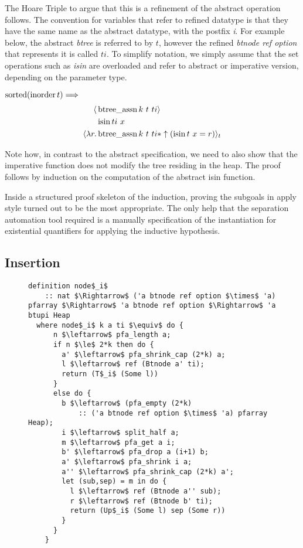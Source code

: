 The Hoare Triple to argue that this is a refinement of the abstract operation
follows.
The convention for variables that refer to refined datatype
is that they have the same name as the abstract datatype,
with the postfix \textit{i}.
For example below, the abstract \textit{btree} is referred to by $t$,
however the refined \textit{btnode ref option} that represents it
is called $ti$.
To simplify notation, we simply assume that the set operations
such as \textit{isin} are overloaded and refer to abstract or
imperative version, depending on the parameter type.

\begin{lemma} $\operatorname{sorted} (\operatorname{inorder} t) \Longrightarrow$ \\
\begin{align*}
   \langle &\operatorname{btree\_assn} k\ t\ ti\rangle \\
           &\operatorname{isin} ti\ x \\
   \langle \lambda r. &\operatorname{btree\_assn} k\ t\ ti * \uparrow(\operatorname{isin} t\ x = r)\rangle_t
\end{align*}
\end{lemma}

Note how, in contrast to the abstract specification,
we need to also show that the imperative function does not modify the tree
residing in the heap.
The proof follows by induction on the computation of the abstract isin function.

Inside a structured proof skeleton of the induction,
proving the subgoals in apply style turned out to be the most
appropriate.
The only help that the separation automation tool required
is a manually specification of the instantiation for existential quantifiers
for applying the inductive hypothesis. 

\subsection{Insertion}
\begin{figure}
\begin{lstlisting}[mathescape=true, language=Isabelle, label={lst:imp-nodei-fun},
    caption={The imperative node$_i$ function}]
definition node$_i$ 
    :: nat $\Rightarrow$ ('a btnode ref option $\times$ 'a) pfarray $\Rightarrow$ 'a btnode ref option $\Rightarrow$ 'a btupi Heap
  where node$_i$ k a ti $\equiv$ do {
      n $\leftarrow$ pfa_length a;
      if n $\le$ 2*k then do {
        a' $\leftarrow$ pfa_shrink_cap (2*k) a;
        l $\leftarrow$ ref (Btnode a' ti);
        return (T$_i$ (Some l))
      }
      else do {
        b $\leftarrow$ (pfa_empty (2*k)
            :: ('a btnode ref option $\times$ 'a) pfarray Heap);
        i $\leftarrow$ split_half a;
        m $\leftarrow$ pfa_get a i;
        b' $\leftarrow$ pfa_drop a (i+1) b;
        a' $\leftarrow$ pfa_shrink i a; 
        a'' $\leftarrow$ pfa_shrink_cap (2*k) a';
        let (sub,sep) = m in do {
          l $\leftarrow$ ref (Btnode a'' sub);
          r $\leftarrow$ ref (Btnode b' ti);
          return (Up$_i$ (Some l) sep (Some r))
        }
      }
    }

\end{lstlisting}
\end{figure}


